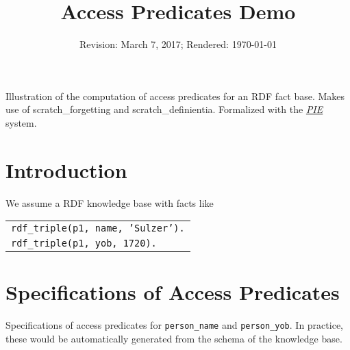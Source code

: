 \documentclass[a4paper]{article}
\newcounter{def}
\begin{document}
%
%
\title{Access Predicates Demo}
\date{Revision: March 7, 2017; Rendered: \today}
\maketitle

\noindent Illustration of the computation of access predicates for an RDF fact
base. Makes use of scratch\_forgetting and scratch\_definientia. Formalized
with the \href{http://cs.christophwernhard.com/pie/}{\textit{PIE}} system.
%
%

\section{Introduction}

We assume a RDF knowledge base with facts like 

\begin{center}
\begin{tabular}{l}
\texttt{rdf\_triple(p1, name, 'Sulzer').}\\
\texttt{rdf\_triple(p1, yob, 1720).}
\end{tabular}
\end{center}

\section{Specifications of Access Predicates}

Specifications of access predicates for \texttt{person\_name} and
\texttt{person\_yob}. In practice, these would be automatically generated from
the schema of the knowledge base.
\end{document}
